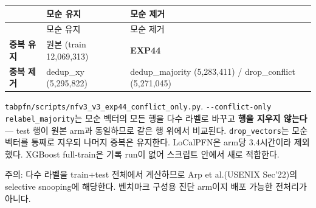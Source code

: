 \begingroup
\footnotesize
\begin{longtable}{>{\raggedright\arraybackslash}p{}>{\raggedright\arraybackslash}p{}>{\raggedright\arraybackslash}p{}}
\toprule
 & 모순 유지 & 모순 제거 \\ \midrule
\endfirsthead
 & 모순 유지 & 모순 제거 \\ \midrule
\endhead
{}\textbf{중복 유지} & 원본 (train 12,069,313) & \textbf{EXP44} \\
{}\textbf{중복 제거} & dedup\_\allowbreak{}xy (5,295,822) & dedup\_\allowbreak{}majority (5,283,411) /\allowbreak{} drop\_\allowbreak{}conflict (5,271,045) \\
\bottomrule
\end{longtable}
\endgroup
\texttt{tabpfn/\allowbreak{}\allowbreak{}s\allowbreak{}cripts/\allowbreak{}\allowbreak{}n\allowbreak{}fv3\_\allowbreak{}\allowbreak{}v3\_\allowbreak{}\allowbreak{}e\allowbreak{}xp44\_\allowbreak{}\allowbreak{}con\allowbreak{}flict\_\allowbreak{}\allowbreak{}on\allowbreak{}ly.\allowbreak{}py}. \texttt{-\allowbreak{}-\allowbreak{}confli\allowbreak{}ct-\allowbreak{}only \allowbreak{}relabel\_\allowbreak{}\allowbreak{}majority\allowbreak{}}는 모순 벡터의 모든 행을 다수 라벨로 바꾸고 \textbf{행을 지우지 않는다} — test 행이 원본 arm과 동일하므로 같은 행 위에서 비교된다. \texttt{drop\_\allowbreak{}\allowbreak{}vec\allowbreak{}tors}는 모순 벡터를 통째로 지우되 나머지 중복은 유지한다. LoCalPFN은 arm당 3.4시간이라 제외했다. XGBoost full-train은 기록 run이 없어 스크립트 안에서 새로 적합한다.

주의: 다수 라벨을 train+\allowbreak{}test 전체에서 계산하므로 Arp et al.(USENIX Sec'22)의 selective snooping에 해당한다. 벤치마크 구성용 진단 arm이지 배포 가능한 전처리가 아니다.

